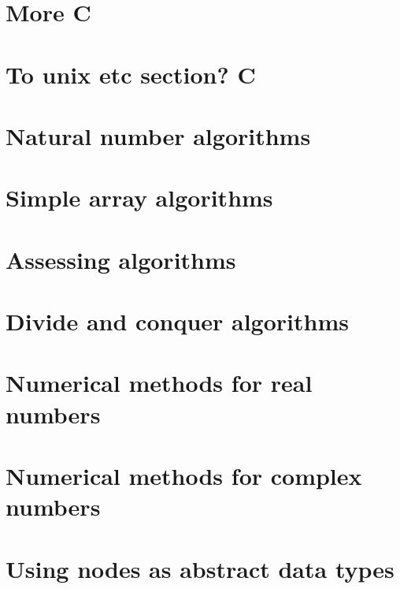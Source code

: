 \documentclass[oneside]{book}
\begin{document}
\part{More C}





\part{To unix etc section? C}



\part{Natural number algorithms}





\part{Simple array algorithms}






\part{Assessing algorithms}



\part{Divide and conquer algorithms}


\part{Numerical methods for real numbers}







\part{Numerical methods for complex numbers}


\part{Using nodes as abstract data types}




\end{document}
